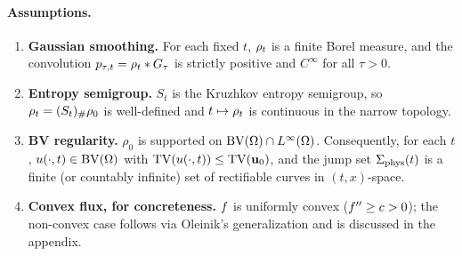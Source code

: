 \paragraph{Assumptions.}
\begin{enumerate}
\item[(A1)] \textbf{Gaussian smoothing.} For each fixed $t$, $\rho_{t}$ is a finite Borel measure, and the convolution $p_{\tau, t} = \rho_{t} * G_{\tau}$ is strictly positive and $C^{\infty}$ for all $\tau > 0$.

\item[(A2)] \textbf{Entropy semigroup.} $S_{t}$ is the Kruzhkov entropy semigroup, so $\rho_{t} = (S_{t})_{\#} \rho_{0}$ is well-defined and $t \mapsto \rho_{t}$ is continuous in the narrow topology.

\item[(A3)] \textbf{BV regularity.} $\rho_{0}$ is supported on $\mathrm{BV}(\Omega) \cap L^{\infty}(\Omega)$. Consequently, for each $t$, $u(\cdot, t) \in \mathrm{BV}(\Omega)$ with $\mathrm{TV}(u(\cdot, t)) \le \mathrm{TV}(\mathbf{u}_{0})$, and the jump set $\Sigma_{\mathrm{phys}}(t)$ is a finite (or countably infinite) set of rectifiable curves in $(t,x)$-space.

\item[(A4)] \textbf{Convex flux, for concreteness.} $f$ is uniformly convex ($f'' \ge c > 0$); the non-convex case follows via Oleinik's generalization \citep{oleinik1957} and is discussed in the appendix.
\end{enumerate}

